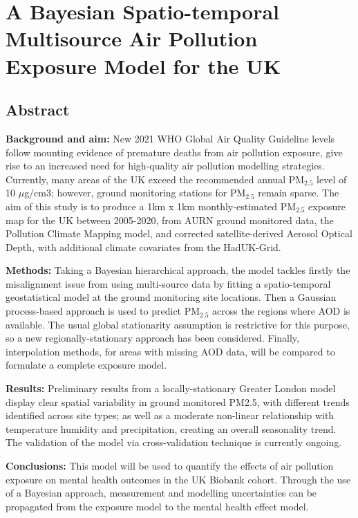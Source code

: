\chapter{A Bayesian Spatio-temporal Multisource Air Pollution Exposure Model for the UK}
\section{Abstract}
\textbf{Background and aim:} New 2021 WHO Global Air Quality Guideline levels follow mounting evidence of premature deaths from air pollution exposure, give rise to an increased need for high-quality air pollution modelling strategies. Currently, many areas of the UK exceed the recommended annual PM$_{2.5}$ level of 10 $\mu$g/cm3; however, ground monitoring stations for PM$_{2.5}$ remain sparse. The aim of this study is to produce a 1km x 1km monthly-estimated PM$_{2.5}$ exposure map for the UK between 2005-2020, from AURN ground monitored data, the Pollution Climate Mapping model, and corrected satellite-derived Aerosol Optical Depth, with additional climate covariates from the HadUK-Grid.

\textbf{Methods:} Taking a Bayesian hierarchical approach, the model tackles firstly the misalignment issue from using multi-source data by fitting a spatio-temporal geostatistical model at the ground monitoring site locations. Then a Gaussian process-based approach is used to predict PM$_{2.5}$ across the regions where AOD is available. The usual global stationarity assumption is restrictive for this purpose, so a new regionally-stationary approach has been considered. Finally, interpolation methods, for areas with missing AOD data, will be compared to formulate a complete exposure model.

\textbf{Results:} Preliminary results from a locally-stationary Greater London model display clear spatial variability in ground monitored PM2.5, with different trends identified across site types; as well as a moderate non-linear relationship with temperature humidity and precipitation, creating an overall seasonality trend. The validation of the model via cross-validation technique is currently ongoing.

\textbf{Conclusions:} This model will be used to quantify the effects of air pollution exposure on mental health outcomes in the UK Biobank cohort. Through the use of a Bayesian approach, measurement and modelling uncertainties can be propagated from the exposure model to the mental health effect model.

